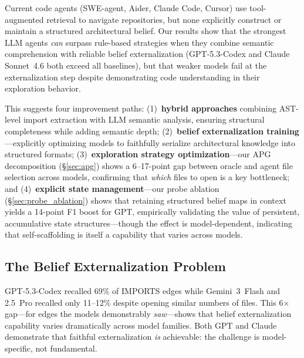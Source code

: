 \documentclass{article}
\begin{document}
Current code agents (SWE-agent, Aider, Claude Code, Cursor) use tool-augmented retrieval to navigate repositories, but none explicitly construct or maintain a structured architectural belief. Our results show that the strongest LLM agents \emph{can} surpass rule-based strategies when they combine semantic comprehension with reliable belief externalization (GPT-5.3-Codex and Claude Sonnet~4.6 both exceed all baselines), but that weaker models fail at the externalization step despite demonstrating code understanding in their exploration behavior.

This suggests four improvement paths: (1)~\textbf{hybrid approaches} combining AST-level import extraction with LLM semantic analysis, ensuring structural completeness while adding semantic depth; (2)~\textbf{belief externalization training}---explicitly optimizing models to faithfully serialize architectural knowledge into structured formats; (3)~\textbf{exploration strategy optimization}---our APG decomposition (\S\ref{sec:apg}) shows a 6--17-point gap between oracle and agent file selection across models, confirming that \emph{which} files to open is a key bottleneck; and (4)~\textbf{explicit state management}---our probe ablation (\S\ref{sec:probe_ablation}) shows that retaining structured belief maps in context yields a 14-point F1 boost for GPT, empirically validating the value of persistent, accumulative state structures---though the effect is model-dependent, indicating that self-scaffolding is itself a capability that varies across models.

\subsection{The Belief Externalization Problem}

GPT-5.3-Codex recalled 69\% of IMPORTS edges while Gemini~3~Flash and 2.5~Pro recalled only 11--12\% despite opening similar numbers of files. This 6$\times$ gap---for edges the models demonstrably \emph{saw}---shows that belief externalization capability varies dramatically across model families. Both GPT and Claude demonstrate that faithful externalization \emph{is} achievable: the challenge is model-specific, not fundamental.
\end{document}
